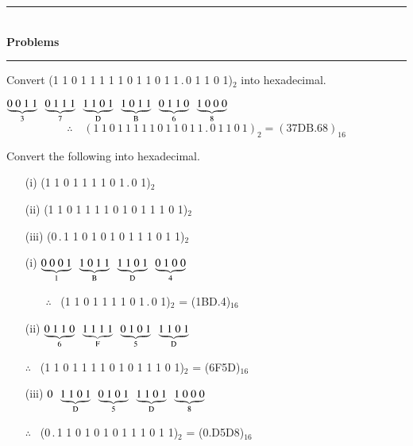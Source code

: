 \begin{center}
\rule{4cm}{1pt}\\
{\bf\Large Problems}\\[-3pt]
\rule{4cm}{1pt}
\end{center}

\begin{problem}\label{prob5.20}
Convert (1 1 0 1 1 1 1 1 0 1 1 0 1 1\,.\,0 1 1 0 1)$_{2}$ into hexadecimal.
\end{problem}

\begin{solution}
$\underbrace{0~0~1~1}_{3} \ \ \underbrace{0~1~1~1}_{7} \ \ \underbrace{1~1~0~1}_{\rmD} \ \ \underbrace{1~0~1~1}_{\rmB} \ \ \underbrace{0~1~1~0}_{6} \ \ \underbrace{1~0~0~0}_{8}$
$$
\therefore\quad (1~1~0~1~1~1~1~1~0~1~1~0~1~1\,.\,0~1~1~0~1)_{2}=(\text{37DB.68})_{16}
$$
\end{solution}

\begin{problem}\label{prob5.21}
Convert the following into hexadecimal.
\begin{itemize}
\item[(i)] (1 1 0 1 1 1 1 0 1\,.\,0 1)$_{2}$

\item[(ii)] (1 1 0 1 1 1 1 0 1 0 1 1 1 0 1)$_{2}$

\item[(iii)] (0\,.\,1 1 0 1 0 1 0 1 1 1 0 1 1)$_{2}$
\end{itemize}
\end{problem}

\begin{solution}
\begin{itemize}
\item[(i)] $\underbrace{0~0~0~1}_{1} \ \ \underbrace{1~0~1~1}_{\rmB} \ \ \underbrace{1~1~0~1}_{\rmD} \ \ \underbrace{0~1~0~0}_{4}$

\smallskip
\qquad\quad~~~ $\therefore$~ (1 1 0 1 1 1 1 0 1\,.\,0 1)$_{2}$ = (1BD.4)$_{16}$

\item[(ii)] $\underbrace{0~1~1~0}_{6} \ \ \underbrace{1~1~1~1}_{\rmF} \ \ \underbrace{0~1~0~1}_{5} \ \ \underbrace{1~1~0~1}_{\rmD}$

\smallskip
$\therefore$~ (1 1 0 1 1 1 1 0 1 0 1 1 1 0 1)$_{2}$ = (6F5D)$_{16}$

\item[(iii)] $0 \ \ \underbrace{1~1~0~1}_{\rmD} \ \ \underbrace{0~1~0~1}_{5} \ \ \underbrace{1~1~0~1}_{\rmD} \ \ \underbrace{1~0~0~0}_{8}$

\smallskip
$\therefore$~ (0\,.\,1 1 0 1 0 1 0 1 1 1 0 1 1)$_{2}$ = (0.D5D8)$_{16}$
\end{itemize}
\end{solution}

